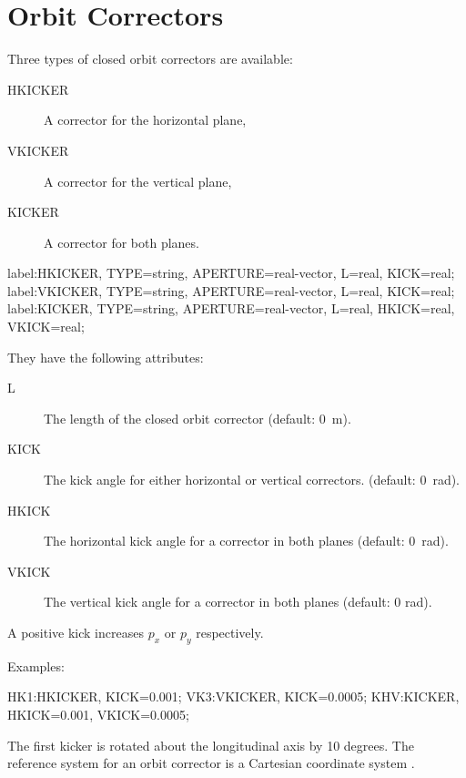 \section{Orbit Correctors}
\label{sec:corrector}
Three types of closed orbit correctors are available:
\begin{description}
\item[HKICKER]
  \label{sec:hkicker}
  A corrector for the horizontal plane,
\item[VKICKER]
  \label{sec:vkicker}
  A corrector for the vertical plane,
\item[KICKER]
  \label{sec:kicker}
  A corrector for both planes.
\end{description}
\begin{example}
label:HKICKER, TYPE=string, APERTURE=real-vector,
      L=real, KICK=real;
label:VKICKER, TYPE=string, APERTURE=real-vector,
      L=real, KICK=real;
label:KICKER, TYPE=string, APERTURE=real-vector,
      L=real, HKICK=real, VKICK=real;
\end{example}
They have the following attributes:
\begin{description}
\item[L]
  The length of the closed orbit corrector (default: 0~m).
\item[KICK]
  The kick angle for either horizontal or vertical correctors.
  (default: 0~rad).
\item[HKICK]
  The horizontal kick angle for a corrector in both planes
  (default: 0~rad).
\item[VKICK]
  The vertical kick angle for a corrector in both planes
  (default: 0 rad).
\end{description}
A positive kick increases $p_{x}$ or $p_{y}$
respectively.

\noindent Examples:
\begin{example}
HK1:HKICKER, KICK=0.001;
VK3:VKICKER, KICK=0.0005;
KHV:KICKER, HKICK=0.001, VKICK=0.0005;
\end{example}
The first kicker is rotated about the longitudinal axis by 10 degrees.
The reference system for an orbit corrector is a
Cartesian coordinate system .

